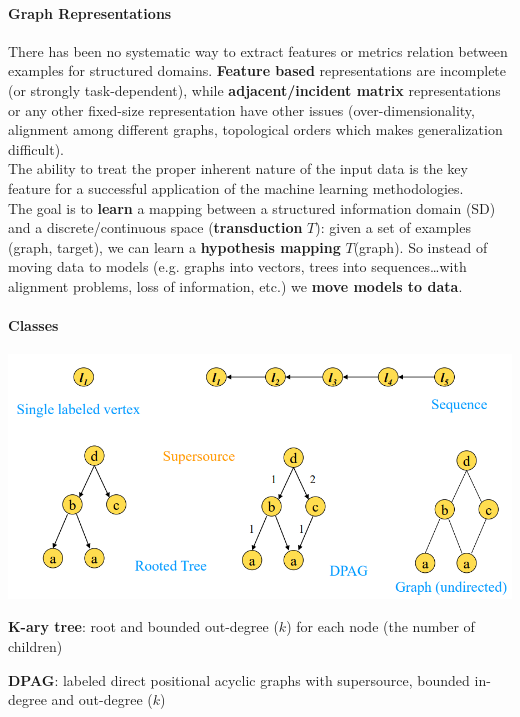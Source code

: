 \documentclass[10pt]{report}
\begin{document}
\paragraph{Graph Representations} There has been no systematic way to extract features or metrics relation between examples for structured domains. \textbf{Feature based} representations are incomplete (or strongly task-dependent), while \textbf{adjacent/incident matrix} representations or any other fixed-size representation have other issues (over-dimensionality, alignment among different graphs, topological orders which makes generalization difficult).\\
The ability to treat the proper inherent nature of the input data is the key feature for a successful application of the machine learning methodologies.\\
The goal is to \textbf{learn} a mapping between a structured information domain (SD) and a discrete/continuous space (\textbf{transduction} $T$): given a set of examples (graph, target), we can learn a \textbf{hypothesis mapping} $T$(graph). So instead of moving data to models (e.g. graphs into vectors, trees into sequences\ldots with alignment problems, loss of information, etc.) we \textbf{move models to data}.
\paragraph{Classes}
\begin{center}
	\includegraphics[scale=0.5]{40.png}
\end{center}\begin{list}{}{}
	\item \textbf{K-ary tree}: root and bounded out-degree ($k$) for each node (the number of children)
	\item \textbf{DPAG}: labeled direct positional acyclic graphs with supersource, bounded in-degree and out-degree ($k$)
\end{list}
\end{document}
